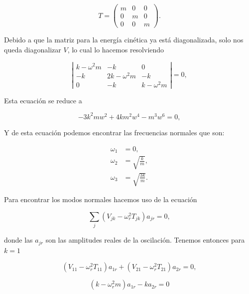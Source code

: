 \documentclass[a4paper,10pt]{article}
\numberwithin{equation}{section}
\begin{document}
\begin{equation}
 T = \begin{pmatrix}
      m & 0 & 0 \\
      0 & m & 0 \\
      0 & 0 & m
     \end{pmatrix}.
\end{equation}

Debido a que la matriz para la energía cinética ya está diagonalizada, solo nos queda 
diagonalizar $V$, lo cual lo hacemos resolviendo

\begin{equation}
 \left| \begin{matrix}
	    k - \omega^2 m & -k & 0 \\
	    -k & 2k - \omega^2 m & -k \\
	    0 & -k & k - \omega^2 m
     \end{matrix}\right| = 0,
\end{equation}

Esta ecuación se reduce a 

\begin{equation}
 - 3 k^{2} m w^{2} + 4 k m^{2} w^{4} - m^{3} w^{6} = 0,
\end{equation}

Y de esta ecuación podemos encontrar las frecuencias normales que son:

\begin{align}
 \omega_1 &= 0, \\
 \omega_2 &= \sqrt{\frac{k}{m}}, \\
 \omega_3 &= \sqrt{\frac{3k}{m}}.
\end{align}

Para encontrar los modos normales hacemos uso de la ecuación

\begin{equation}
 \sum_j (V_{jk} - \omega^2_r T_{jk})a_{jr} = 0,
\end{equation}

donde las $a_{jr}$ son las amplitudes reales de la oscilación. Tenemos entonces 
para $k = 1$ 

\begin{equation}
 (V_{11} - \omega_r^2 T_{11})a_{1r} + (V_{21} - \omega_r^2 T_{21})a_{2r} = 0,
\end{equation}

\begin{equation}
 (k - \omega_r^2m)a_{1r} - k a_{2r} = 0 
\end{equation}
\end{document}
